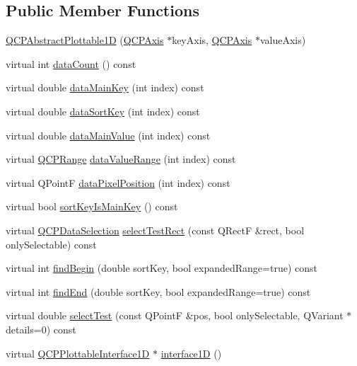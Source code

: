 \subsection*{Public Member Functions}
\begin{DoxyCompactItemize}
\item 
\mbox{\hyperlink{class_q_c_p_abstract_plottable1_d_a30b2e50ab0afce65f104ea7a95440315}{Q\+C\+P\+Abstract\+Plottable1D}} (\mbox{\hyperlink{class_q_c_p_axis}{Q\+C\+P\+Axis}} $\ast$key\+Axis, \mbox{\hyperlink{class_q_c_p_axis}{Q\+C\+P\+Axis}} $\ast$value\+Axis)
\item 
virtual int \mbox{\hyperlink{class_q_c_p_abstract_plottable1_d_a354545da303458283df3f7948a7a768b}{data\+Count}} () const
\item 
virtual double \mbox{\hyperlink{class_q_c_p_abstract_plottable1_d_ab14ab428595856bf76e04499017fa8dc}{data\+Main\+Key}} (int index) const
\item 
virtual double \mbox{\hyperlink{class_q_c_p_abstract_plottable1_d_a6fce4e684f33a31c45928899b5d9ab4b}{data\+Sort\+Key}} (int index) const
\item 
virtual double \mbox{\hyperlink{class_q_c_p_abstract_plottable1_d_a0f913bb0889ca7cb574657a078fc8cff}{data\+Main\+Value}} (int index) const
\item 
virtual \mbox{\hyperlink{class_q_c_p_range}{Q\+C\+P\+Range}} \mbox{\hyperlink{class_q_c_p_abstract_plottable1_d_ac6201b01aee550ef0a240183781d1f9a}{data\+Value\+Range}} (int index) const
\item 
virtual Q\+PointF \mbox{\hyperlink{class_q_c_p_abstract_plottable1_d_a14cf167457cda163575e6eec2a0b178d}{data\+Pixel\+Position}} (int index) const
\item 
virtual bool \mbox{\hyperlink{class_q_c_p_abstract_plottable1_d_a022e8905f5a667d8379493d6a037e79f}{sort\+Key\+Is\+Main\+Key}} () const
\item 
virtual \mbox{\hyperlink{class_q_c_p_data_selection}{Q\+C\+P\+Data\+Selection}} \mbox{\hyperlink{class_q_c_p_abstract_plottable1_d_ac385c38a79e419ed3600c2ee398fd216}{select\+Test\+Rect}} (const Q\+RectF \&rect, bool only\+Selectable) const
\item 
virtual int \mbox{\hyperlink{class_q_c_p_abstract_plottable1_d_ae6ead74a0d6a17954e1857f361b9ccf2}{find\+Begin}} (double sort\+Key, bool expanded\+Range=true) const
\item 
virtual int \mbox{\hyperlink{class_q_c_p_abstract_plottable1_d_ad913df7f02add35150779dce3913aeae}{find\+End}} (double sort\+Key, bool expanded\+Range=true) const
\item 
virtual double \mbox{\hyperlink{class_q_c_p_abstract_plottable1_d_a071e2df66ba1746067dfcb5e27947b43}{select\+Test}} (const Q\+PointF \&pos, bool only\+Selectable, Q\+Variant $\ast$details=0) const
\item 
virtual \mbox{\hyperlink{class_q_c_p_plottable_interface1_d}{Q\+C\+P\+Plottable\+Interface1D}} $\ast$ \mbox{\hyperlink{class_q_c_p_abstract_plottable1_d_a3ab7511c279af967955369606c584dd6}{interface1D}} ()
\end{DoxyCompactItemize}
